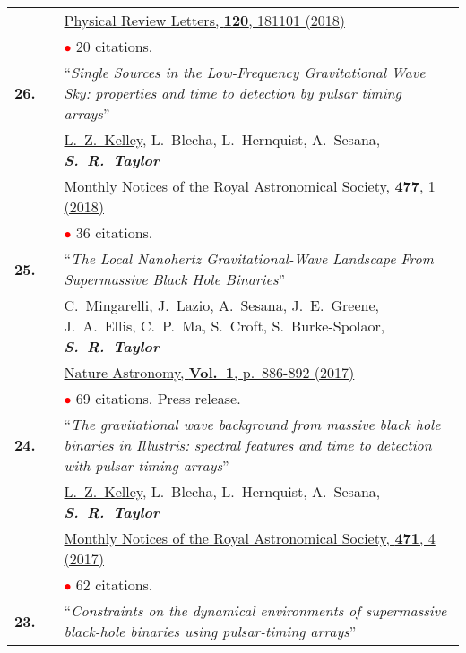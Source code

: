 \documentclass[11pt,letterpaper,sans]{moderncv}
\begin{document}
{\begin{longtable}{rp{0.3cm}p{15.8cm}}
&& \href{https://journals.aps.org/prl/abstract/10.1103/PhysRevLett.120.181101}{{\color{color1} Physical Review Letters, \textbf{120}, 181101 (2018)}}  \\
&& \textcolor{red}{$\bullet$} $20$ citations. \vspace{0.09cm}\\
\textbf{26.} & & ``\textit{Single Sources in the Low-Frequency Gravitational Wave Sky: properties and time to detection by pulsar timing arrays}'' \\ 
&&\underline{L.~Z.~Kelley}, L.~Blecha, L.~Hernquist, A.~Sesana, \textit{\textbf{S.~R.~Taylor}} \\
&& \href{https://academic.oup.com/mnras/article-abstract/477/1/964/4937809?redirectedFrom=fulltext}{{\color{color1} Monthly Notices of the Royal Astronomical Society, \textbf{477}, 1 (2018)}}  \\
&& \textcolor{red}{$\bullet$} $36$ citations. \vspace{0.09cm}\\
\textbf{25.} & & ``\textit{The Local Nanohertz Gravitational-Wave Landscape From Supermassive Black Hole Binaries}'' \\ 
&&C.~Mingarelli, J.~Lazio, A.~Sesana, J.~E.~Greene, J.~A.~Ellis, C.~P.~Ma, S.~Croft, S.~Burke-Spolaor, \textit{\textbf{S.~R.~Taylor}} \\
&& \href{https://www.nature.com/articles/s41550-017-0299-6}{{\color{color1} Nature Astronomy, \textbf{Vol.~1}, p.~886-892 (2017)}} \\
&& \textcolor{red}{$\bullet$} $69$ citations. Press release. \vspace{0.09cm}\\
\textbf{24.} & & ``\textit{The gravitational wave background from massive black hole binaries in Illustris: spectral features and time to detection with pulsar timing arrays}'' \\ 
&& \underline{L.~Z.~Kelley}, L.~Blecha, L.~Hernquist, A.~Sesana, \textit{\textbf{S.~R.~Taylor}} \\ 
&& \href{https://academic.oup.com/mnras/article/471/4/4508/3899130/The-gravitational-wave-background-from-massive}{{\color{color1} Monthly Notices of the Royal Astronomical Society, \textbf{471}, 4 (2017)}} \\
&& \textcolor{red}{$\bullet$} $62$ citations. \vspace{0.09cm}\\
\textbf{23.} & & ``\textit{Constraints on the dynamical environments of supermassive black-hole binaries using pulsar-timing arrays}'' \\ 

\end{longtable}}
\end{document}
